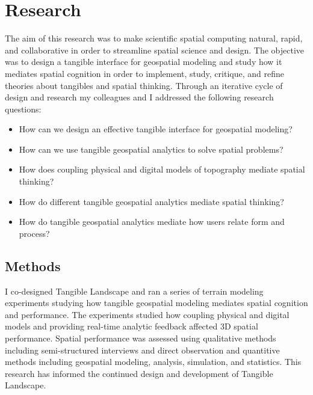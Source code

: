 \section{Research}


The aim of this research was to make
scientific spatial computing 
natural, rapid, and collaborative
in order to
streamline spatial science and design. 
The objective was to 
design a tangible interface for geospatial modeling
and study how it mediates spatial cognition
in order 
to implement, study, critique, and refine 
theories about tangibles and spatial thinking. 
Through an iterative cycle of design and research 
my colleagues and I addressed the following research questions: 
\begin{itemize}
\item How can we design an effective tangible interface for geospatial modeling?
\item How can we use tangible geospatial analytics to solve spatial problems?
\item How does coupling physical and digital models of topography mediate spatial thinking?
\item How do different tangible geospatial analytics mediate spatial thinking?
\item How do tangible geospatial analytics
mediate how users relate form and process?
\end{itemize}

\subsection{Methods}
I co-designed Tangible Landscape 
and ran a series of terrain modeling experiments 
studying how tangible geospatial modeling 
mediates spatial cognition and performance.
The experiments studied how 
coupling physical and digital models
and providing real-time analytic feedback
affected 3D spatial performance.
Spatial performance was assessed using
qualitative methods 
including semi-structured interviews and direct observation
and quantitive methods 
including geospatial modeling, 
analysis, simulation, and statistics.
This research has informed 
the continued design and development
of Tangible Landscape.

